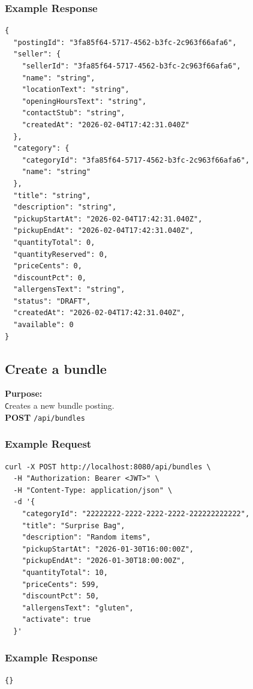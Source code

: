 \documentclass[a4paper,11pt]{article}
\begin{document}
\subsubsection*{Example Response}
\begin{lstlisting}
{
  "postingId": "3fa85f64-5717-4562-b3fc-2c963f66afa6",
  "seller": {
    "sellerId": "3fa85f64-5717-4562-b3fc-2c963f66afa6",
    "name": "string",
    "locationText": "string",
    "openingHoursText": "string",
    "contactStub": "string",
    "createdAt": "2026-02-04T17:42:31.040Z"
  },
  "category": {
    "categoryId": "3fa85f64-5717-4562-b3fc-2c963f66afa6",
    "name": "string"
  },
  "title": "string",
  "description": "string",
  "pickupStartAt": "2026-02-04T17:42:31.040Z",
  "pickupEndAt": "2026-02-04T17:42:31.040Z",
  "quantityTotal": 0,
  "quantityReserved": 0,
  "priceCents": 0,
  "discountPct": 0,
  "allergensText": "string",
  "status": "DRAFT",
  "createdAt": "2026-02-04T17:42:31.040Z",
  "available": 0
}
\end{lstlisting}

\subsection{Create a bundle}
\textbf{Purpose:} \\ \texttt Creates a new bundle posting. \\

\textbf{POST} \texttt{/api/bundles}

\subsubsection*{Example Request}
\begin{lstlisting}
curl -X POST http://localhost:8080/api/bundles \
  -H "Authorization: Bearer <JWT>" \
  -H "Content-Type: application/json" \
  -d '{
    "categoryId": "22222222-2222-2222-2222-222222222222",
    "title": "Surprise Bag",
    "description": "Random items",
    "pickupStartAt": "2026-01-30T16:00:00Z",
    "pickupEndAt": "2026-01-30T18:00:00Z",
    "quantityTotal": 10,
    "priceCents": 599,
    "discountPct": 50,
    "allergensText": "gluten",
    "activate": true
  }'
\end{lstlisting}

\subsubsection*{Example Response}
\begin{lstlisting}
{}
\end{lstlisting}
\end{document}
